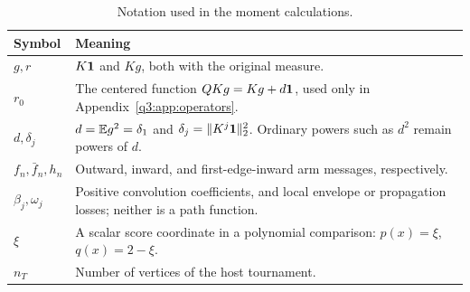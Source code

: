\begin{table}[htbp]\centering\small
\caption{Notation used in the moment calculations.}\label{tab:notation}
\begin{tabular}{@{}p{29mm}p{117mm}@{}}\toprule
Symbol & Meaning\\\midrule
$g,r$ & $K\mathbf1$ and $Kg$, both with the original measure.\\
$r_0$ & The centered function $QKg=Kg+d\mathbf1$, used only in Appendix~\ref{q3:app:operators}.\\
$d,\delta_j$ & $d=\mathbb E g^2=\delta_1$ and $\delta_j=\|K^j\mathbf1\|_2^2$. Ordinary powers such as $d^2$ remain powers of $d$.\\
$f_n,\bar f_n,h_n$ & Outward, inward, and first-edge-inward arm messages, respectively.\\
$\beta_j,\omega_j$ & Positive convolution coefficients, and local envelope or propagation losses; neither is a path function.\\
$\xi$ & A scalar score coordinate in a polynomial comparison: $p(x)=\xi$, $q(x)=2-\xi$.\\
$n_T$ & Number of vertices of the host tournament.\\\bottomrule
\end{tabular}
\end{table}
